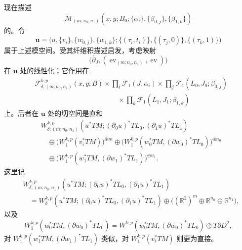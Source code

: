 现在描述
\[
 \widetilde{\mathcal M}_{(m;n_0,n_1)}
 (x,y;B_0;\{\alpha_i\},\{\beta_{0,j}\},\{\beta_{1,k}\})
\]
的\termVirtualTangentSpace{}。令
\[
 \mathbf u=\bigl(u,\{v_i\},\{w_{0,j}\},\{w_{1,k}\};
 \{(\tau_i,t_i)\},\{(\tau_j,0)\},\{(\tau_k,1)\}\bigr)
\]
属于上述模空间。受其纤维积描述启发，考虑映射
\[
 \bigl(\overline\partial_J,
 (\operatorname{ev}_{(m;n_0,n_1)},\operatorname{ev})\bigr)
\]
在 $\mathbf u$ 处的线性化；它作用在
\[
\begin{aligned}
 &\mathcal F_{\delta;(m;n_0,n_1)}^{k,p}(x,y;B)
 \times\prod_i\mathcal F_1(J,\alpha_i)
 \times\prod_j\mathcal F_1(L_0,J_0;\beta_{0,j})\\
 &\hspace{12em}\times\prod_k\mathcal F_1(L_1,J_1;\beta_{1,k})
\end{aligned}
\]
上。后者在 $\mathbf u$ 处的切空间是直和
\[
\begin{aligned}
 &W_{\delta;(m;n_0,n_1)}^{k,p}
 (u^*TM;(\partial_0u)^*TL_0,(\partial_1u)^*TL_1)\\
 &\quad\oplus\bigl(W_1^{k,p}(v_i^*TM)\bigr)^{\oplus m}
 \oplus\bigl(W_1^{k,p}(w_0^*TM,(\partial w_0)^*TL_0)\bigr)^{\oplus n_0}\\
 &\quad\oplus\bigl(W_1^{k,p}(w_1^*TM,(\partial w_1)^*TL_1)\bigr)^{\oplus n_1}.
\end{aligned}
\]
这里记
\[
\begin{aligned}
 &W_{\delta;(m;n_0,n_1)}^{k,p}
 (u^*TM;(\partial_0u)^*TL_0,(\partial_1u)^*TL_1)\\
 &\quad=W_\delta^{k,p}(u^*TM;(\partial_0u)^*TL_0,(\partial_1u)^*TL_1)
 \oplus\bigl((\mathbb R^2)^m\oplus\mathbb R^{n_0}\oplus\mathbb R^{n_1}\bigr),
\end{aligned}
\]
以及
\[
 W_1^{k,p}(w_0^*TM,(\partial w_0)^*TL_0)
 =W^{k,p}(w_0^*TM,(\partial w_0)^*TL_0)\oplus T\partial D^2,
\]
对 $W_1^{k,p}(w_1^*TM,(\partial w_1)^*TL_1)$ 类似，对
$W_1^{k,p}(v_i^*TM)$ 则更为直接。


